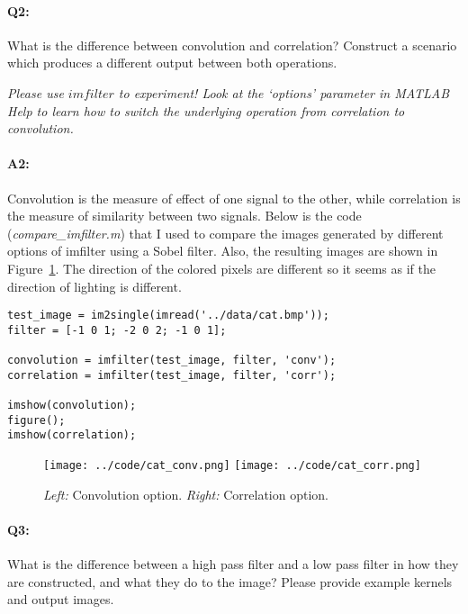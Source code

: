 	
	
	
	\pagebreak
	\paragraph{Q2:} What is the difference between convolution and correlation? Construct a scenario which produces a different output between both operations.
	
	\emph{Please use \href{https://www.mathworks.com/help/images/ref/imfilter.html}{$imfilter$} to experiment! Look at the `options' parameter in MATLAB Help to learn how to switch the underlying operation from correlation to convolution.}
	
	\paragraph{A2:} Convolution is the measure of effect of one signal to the other, while correlation is the measure of similarity between two signals. Below is the code (\emph{compare\_imfilter.m}) that I used to compare the images generated by different options of imfilter using a Sobel filter. Also, the resulting images are shown in Figure~\ref{fig:result1}. The direction of the colored pixels are different so it seems as if the direction of lighting is different.
	
	\begin{lstlisting}[style=Matlab-editor]
test_image = im2single(imread('../data/cat.bmp'));
filter = [-1 0 1; -2 0 2; -1 0 1];

convolution = imfilter(test_image, filter, 'conv');
correlation = imfilter(test_image, filter, 'corr');

imshow(convolution);
figure();
imshow(correlation);
	\end{lstlisting}
	\begin{figure}[h!]
		\centering
		\texttt{[image: ../code/cat\_conv.png]}
		\texttt{[image: ../code/cat\_corr.png]}
		\caption{\emph{Left:} Convolution option. \emph{Right:} Correlation option.}
		\label{fig:result1}
	\end{figure}
	
	
	
	
	
	\pagebreak
	\paragraph{Q3:} What is the difference between a high pass filter and a low pass filter in how they are constructed, and what they do to the image? Please provide example kernels and output images.
	
